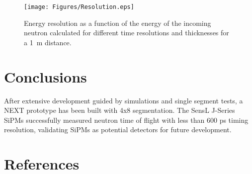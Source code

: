 \documentclass[preprint,3p,twocolumn]{elsarticle}
\begin{document}
\begin{figure}[tb]
\centering
\texttt{[image: Figures/Resolution.eps]}
\caption{Energy resolution as a function of the energy of the incoming neutron calculated for different time resolutions and thicknesses for a 1~m distance.}
\label{fig:resolution}
\end{figure}







\section{Conclusions}
After extensive development guided by simulations and single segment tests, a NEXT prototype has been built with 4x8 segmentation. The SensL\textsuperscript{\texttrademark} J-Series SiPMs successfully measured neutron time of flight with less than 600 ps timing resolution, validating SiPMs as potential detectors for future development.

\section*{References}
%

\end{document}
